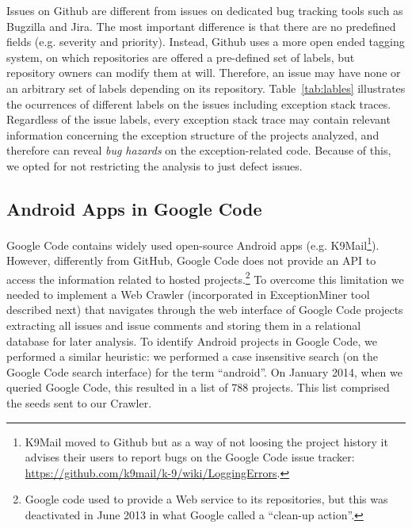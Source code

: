 \documentclass[conference]{IEEEtran}
\begin{document}
Issues on Github are different from issues on dedicated bug tracking tools such as 
Bugzilla and Jira. The most important difference is that there are no predefined fields
  (e.g. severity and priority). Instead, Github uses a more open ended tagging system, on which
repositories are offered a pre-defined set of labels, but repository owners can modify 
them at will. Therefore, an issue may have none or an arbitrary set of labels depending 
on its repository. Table~\ref{tab:lables} illustrates the ocurrences of different labels 
on the issues including exception stack traces. Regardless of the issue labels, every exception stack
trace may contain relevant information concerning the exception structure of the
projects analyzed, and therefore can reveal \emph{bug hazards} on the exception-related code.
Because of this, we opted for not restricting the analysis to just defect issues.


\subsection{Android Apps in Google Code}
Google Code contains widely used open-source Android apps (e.g. K9Mail\footnote{K9Mail moved to Github but as a way of not loosing the project history it advises their users to report bugs on the Google Code issue tracker: \url{https://github.com/k9mail/k-9/wiki/LoggingErrors}.}).
However, differently from GitHub, Google Code does not provide an API to access the information related
 to hosted projects.\footnote{Google code used to provide a Web service to its repositories, but this was deactivated in June 2013 in what Google called a ``clean-up action''.}
To overcome this limitation we needed to implement a Web Crawler (incorporated in ExceptionMiner tool described next) that navigates 
through the web interface of Google Code projects extracting all issues and issue comments and storing them in a relational database for later analysis.
To identify Android projects in Google Code, we performed a similar heuristic: we performed a case insensitive search 
(on the Google Code search interface) for the term ``android''. On January 2014, when we queried Google Code, this resulted in a list of 788  projects. This list comprised the seeds sent to our Crawler.
\end{document}
